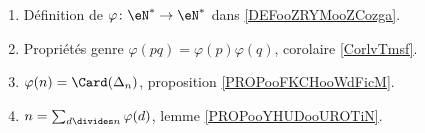 		\label{THMooUDYMooCCXdbw}
\begin{enumerate}
	\item
	      Définition de \(\varphi \colon \eN^*\to \eN^*  \) dans \ref{DEFooZRYMooZCozga}.
	\item
	      Propriétés genre \( \varphi(pq)=\varphi(p)\varphi(q)\), corolaire \ref{CorlvTmsf}.
	\item
	      \( \varphi(n)=\Card(\Delta_n)\), proposition \ref{PROPooFKCHooWdFicM}.
	\item
	      \( n=\sum_{d\divides n}\varphi(d)\), lemme \ref{PROPooYHUDooUROTiN}.
\end{enumerate}
